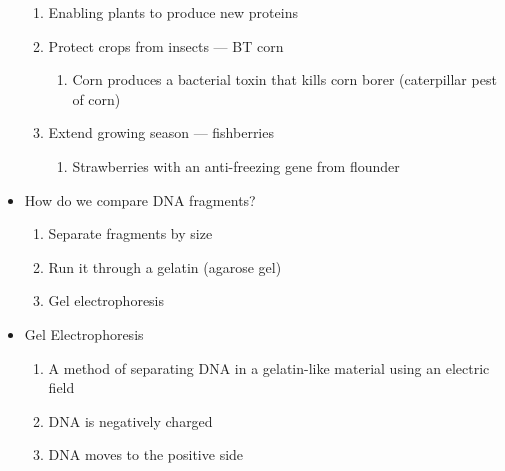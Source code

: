 \documentclass[12pt]{article}
\begin{document}
\begin{itemize}
    \begin{enumerate}

      \item Enabling plants to produce new proteins

      \item Protect crops from insects — BT corn

        \begin{enumerate}

          \item Corn produces a bacterial toxin that kills corn borer (caterpillar pest of corn)

        \end{enumerate}

      \item Extend growing season — fishberries

        \begin{enumerate}

          \item Strawberries with an anti-freezing gene from flounder

        \end{enumerate}

    \end{enumerate}

  \item How do we compare DNA fragments?

    \begin{enumerate}

      \item Separate fragments by size

      \item Run it through a gelatin (agarose gel)

      \item Gel electrophoresis

    \end{enumerate}

  \item Gel Electrophoresis

    \begin{enumerate}

      \item A method of separating DNA in a gelatin-like material using an electric field

      \item DNA is negatively charged

      \item DNA moves to the positive side


\end{enumerate}
\end{itemize}
\end{document}
